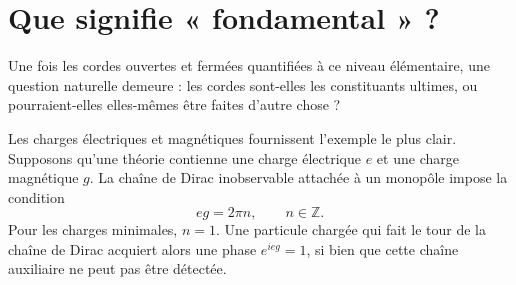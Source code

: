 \section{Que signifie « fondamental » ?}

Une fois les cordes ouvertes et fermées quantifiées à ce niveau élémentaire, une question naturelle demeure : les cordes sont-elles les constituants ultimes, ou pourraient-elles elles-mêmes être faites d’autre chose ?

\begin{classroomqa}
\end{classroomqa}

Les charges électriques et magnétiques fournissent l’exemple le plus clair. Supposons qu’une théorie contienne une charge électrique \(e\) et une charge magnétique \(g\). La chaîne de Dirac inobservable attachée à un monopôle impose la condition
\begin{equation}
  eg=2\pi n,
  \qquad n\in\mathbb Z.
  \label{eq:l04-dirac-quantization}
\end{equation}
Pour les charges minimales, \(n=1\). Une particule chargée qui fait le tour de la chaîne de Dirac acquiert alors une phase \(e^{ieg}=1\), si bien que cette chaîne auxiliaire ne peut pas être détectée.

